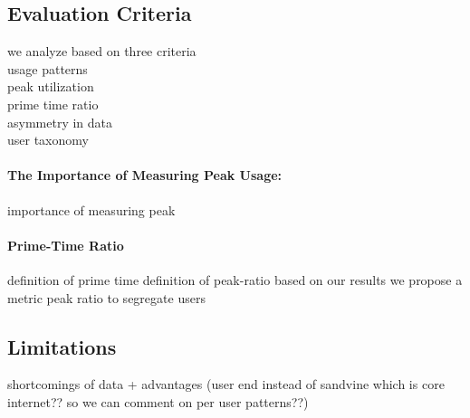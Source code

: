 \subsection{Evaluation Criteria}
we analyze based on three criteria\\
usage patterns\\
peak utilization\\
prime time ratio\\
asymmetry in data\\
user taxonomy


\paragraph{The Importance of Measuring Peak Usage:}
 importance of measuring peak

\paragraph{Prime-Time Ratio} definition of prime time
definition of peak-ratio
based on our results we propose a metric peak ratio to segregate users

\subsection{Limitations}
 
 shortcomings of data + advantages (user end instead of sandvine which is core internet?? so we can comment on per user patterns??)